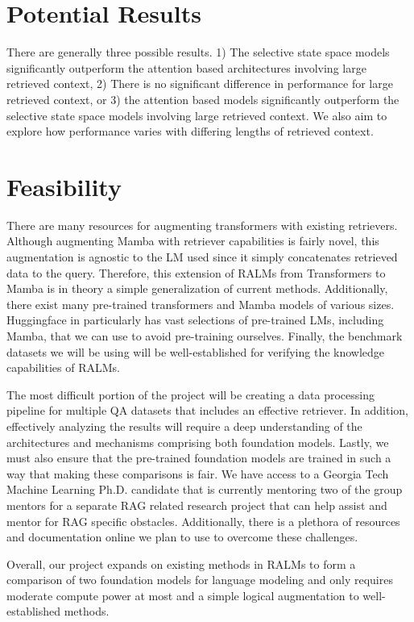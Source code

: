 \documentclass[11pt]{article}
\begin{document}
\section{Potential Results}
There are generally three possible results. 1) The selective state space models significantly outperform the attention based architectures involving large retrieved context, 2) There is no significant difference in performance for large retrieved context, or 3) the attention based models significantly outperform the selective state space models involving large retrieved context. We also aim to explore how performance varies with differing lengths of retrieved context.

\section{Feasibility}
There are many resources for augmenting transformers with existing retrievers. Although augmenting Mamba with retriever capabilities is fairly novel, this augmentation is agnostic to the LM used since it simply concatenates retrieved data to the query. Therefore, this extension of RALMs from Transformers to Mamba is in theory a simple generalization of current methods. Additionally, there exist many pre-trained transformers and Mamba models of various sizes. Huggingface in particularly has vast selections of pre-trained LMs, including Mamba, that we can use to avoid pre-training ourselves. Finally, the benchmark datasets we will be using will be well-established for verifying the knowledge capabilities of RALMs. 

The most difficult portion of the project will be creating a data processing pipeline for multiple QA datasets that includes an effective retriever. In addition, effectively analyzing the results will require a deep understanding of the architectures and mechanisms comprising both foundation models. Lastly, we must also ensure that the pre-trained foundation models are trained in such a way that making these comparisons is fair. We have access to a Georgia Tech Machine Learning Ph.D. candidate that is currently mentoring two of the group mentors for a separate RAG related research project that can help assist and mentor for RAG specific obstacles. Additionally, there is a plethora of resources and documentation online we plan to use to overcome these challenges.

Overall, our project expands on existing methods in RALMs to form a comparison of two foundation models for language modeling and only requires moderate compute power at most and a simple logical augmentation to well-established methods.





\end{document}
